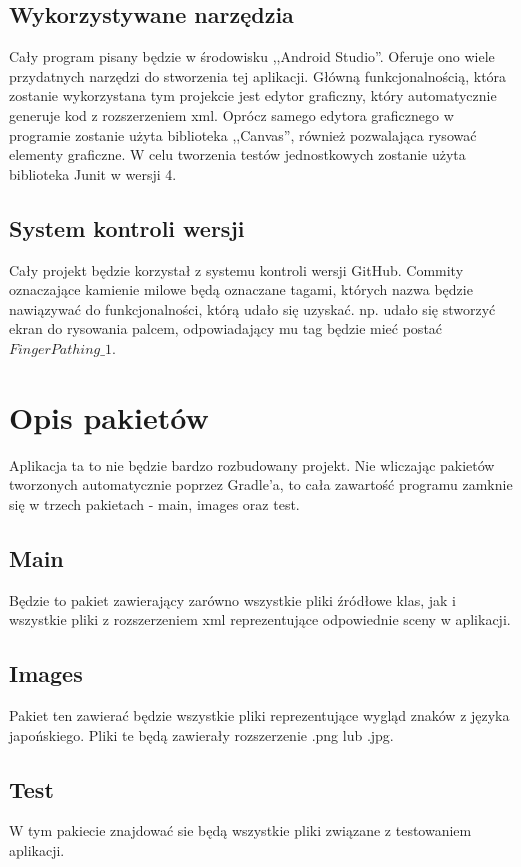 \documentclass[15pt]{article}
\begin{document}
  \subsection{Wykorzystywane narzędzia}
  Cały program pisany będzie w środowisku ,,Android Studio''. Oferuje ono wiele przydatnych narzędzi do stworzenia tej aplikacji. Główną funkcjonalnością, która zostanie wykorzystana tym projekcie jest edytor graficzny, który automatycznie generuje kod z rozszerzeniem xml. Oprócz samego edytora graficznego w programie zostanie użyta biblioteka ,,Canvas'', również pozwalająca rysować elementy graficzne. W celu tworzenia testów jednostkowych zostanie użyta biblioteka Junit w wersji 4. 
  
  \subsection{System kontroli wersji}
  Cały projekt będzie korzystał z systemu kontroli wersji GitHub.
  Commity oznaczające kamienie milowe będą oznaczane tagami,
  których nazwa będzie nawiązywać do funkcjonalności, którą udało się uzyskać. 
  \newline 
  \newline
  np. udało się stworzyć ekran do rysowania palcem, odpowiadający mu tag będzie mieć postać $FingerPathing\_1.$
  \section{Opis pakietów}
  Aplikacja ta to nie będzie bardzo rozbudowany projekt. Nie wliczając pakietów tworzonych automatycznie poprzez Gradle'a, to cała zawartość programu zamknie się w trzech pakietach - main, images oraz test. 
  
  
  \subsection{Main}
  Będzie to pakiet zawierający zarówno wszystkie pliki źródłowe klas, jak i wszystkie pliki z rozszerzeniem xml reprezentujące odpowiednie sceny w aplikacji.
  
  \subsection{Images}
  Pakiet ten zawierać będzie wszystkie pliki reprezentujące wygląd znaków z języka japońskiego. Pliki te będą zawierały rozszerzenie .png lub .jpg.
  \subsection{Test}
  W tym pakiecie znajdować sie będą wszystkie pliki związane z testowaniem aplikacji. 
  \newpage
\end{document}
